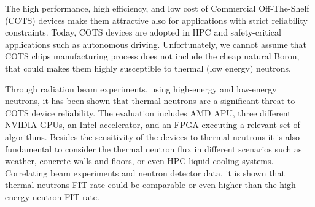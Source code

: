 The high performance, high efficiency, and low cost of Commercial Off-The-Shelf (COTS) devices make them attractive also for applications with strict reliability constraints. Today, COTS devices are adopted in HPC and safety-critical applications such as autonomous driving. Unfortunately, we cannot assume that COTS chips manufacturing process does not include the cheap natural Boron, that could makes them highly susceptible to thermal (low energy) neutrons.

Through radiation beam experiments, using high-energy and low-energy neutrons, it has been shown that thermal neutrons are a significant threat to COTS device reliability. The evaluation includes AMD APU, three different NVIDIA GPUs, an Intel accelerator, and an FPGA executing a relevant set of algorithms. Besides the sensitivity of the devices to thermal neutrons it is also fundamental to consider the thermal neutron flux in different scenarios such as weather, concrete walls and floors, or even HPC liquid cooling systems. Correlating beam experiments and neutron detector data, it is shown that thermal neutrons FIT rate could be comparable or even higher than the high energy neutron FIT rate.